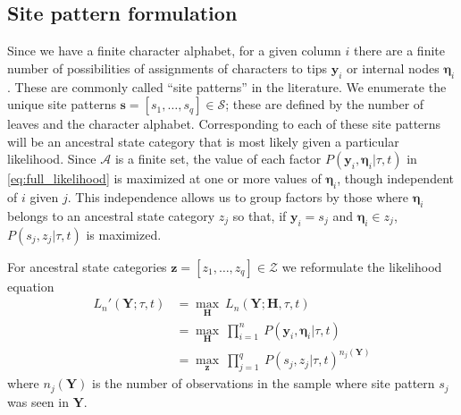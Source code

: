 \documentclass[a4paper]{article}
\newcommand{\alphabet}{\mathcal{A}}
\newcommand{\fullAlignment}{\mathbf{Y}}
\newcommand{\alignmentColumn}{\mathbf{y}}
\newcommand{\sitePattern}{s}
\newcommand{\fullAncestralStates}{\mathbf{H}}
\newcommand{\ancestralStateColumn}{\boldsymbol\eta}
\newcommand{\ancestralStateCategory}{z}
\newcommand{\fullAncestralStateCategories}{\mathbf{z}}
\newcommand{\ancestralStateCategorySpace}{\mathcal{Z}}
\begin{document}
\subsection{Site pattern formulation}

Since we have a finite character alphabet, for a given column $i$ there are a finite number of possibilities of assignments of characters to tips $\alignmentColumn_i$ or internal nodes $\ancestralStateColumn_i$.
These are commonly called ``site patterns'' in the literature.
We enumerate the unique site patterns $\mathbf{s}=[s_1,\ldots,s_q]\in\mathcal{S}$; these are defined by the number of leaves and the character alphabet.
Corresponding to each of these site patterns will be an ancestral state category that is most likely given a particular likelihood.
Since $\alphabet$ is a finite set, the value of each factor $P(\alignmentColumn_i, \ancestralStateColumn_i | \tau, t)$ in \eqref{eq:full_likelihood} is maximized at one or more values of $\ancestralStateColumn_i$, though independent of $i$ given $j$.
This independence allows us to group factors by those where $\ancestralStateColumn_i$ belongs to an ancestral state category $\ancestralStateCategory_j$ so that, if $\alignmentColumn_i=\sitePattern_j$ and $\ancestralStateColumn_i\in \ancestralStateCategory_j$, $P(\sitePattern_j, \ancestralStateCategory_j | \tau, t)$ is maximized.

For ancestral state categories $\fullAncestralStateCategories=[\ancestralStateCategory_1,\ldots,\ancestralStateCategory_q]\in\ancestralStateCategorySpace$ we reformulate the likelihood equation
\begin{align}
L_n'(\fullAlignment;\tau, t) &= \max_{\fullAncestralStates} \ L_n(\fullAlignment;\fullAncestralStates, \tau, t) \\
                             &= \max_{\fullAncestralStates} \ \prod_{i=1}^{n} \ P(\alignmentColumn_i, \ancestralStateColumn_i | \tau, t) \\
                             &= \max_{\fullAncestralStateCategories} \ \prod_{j=1}^{q} \ P(\sitePattern_j, \ancestralStateCategory_j | \tau, t)^{n_j(\fullAlignment)} \label{eq:site_pattern_likelihood}
\end{align}
where $n_j(\fullAlignment)$ is the number of observations in the sample where site pattern $\sitePattern_j$ was seen in $\fullAlignment$.
\end{document}

